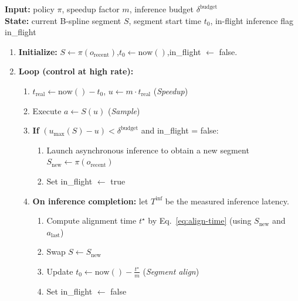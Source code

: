 \begin{algorithm}[h]
\caption{Inference pipeline}
\label{alg:pipeline-inference}
\textbf{Input:} policy $\pi$, speedup factor $m$, inference budget $\delta^{\text{budget}}$ \\
\textbf{State:} current B-spline segment $S$, segment start time $t_0$, in-flight inference flag \quad in\_flight
\begin{enumerate}[leftmargin=1.2em]
\item \textbf{Initialize:} $S \leftarrow \pi(o_{\text{recent}})$,\quad $t_0 \leftarrow \text{now}()$,\quad in\_flight $\leftarrow$ false.
\item \textbf{Loop (control at high rate):}
\begin{enumerate}[leftmargin=1.2em]
\item $t_{\text{real}} \leftarrow \text{now}() - t_0$, \quad $u \leftarrow m \cdot t_{\text{real}}$ \hfill(\textit{Speedup})
\item Execute $a \leftarrow S(u)$ \hfill(\textit{Sample})
\item \textbf{If} $(u_{\max}(S) - u) < \delta^{\text{budget}}$ and in\_flight = false:
\begin{enumerate}[leftmargin=1.2em]
\item Launch asynchronous inference to obtain a new segment $S_{\text{new}} \leftarrow \pi(o_{\text{recent}})$
\item Set in\_flight $\leftarrow$ true
\end{enumerate}
\item \textbf{On inference completion:} let $T^{\text{inf}}$ be the measured inference latency.
\begin{enumerate}[leftmargin=1.2em]
\item Compute alignment time $t^\star$ by Eq.~\eqref{eq:align-time} (using $S_{\text{new}}$ and $a_{\text{last}}$)
\item Swap $S \leftarrow S_{\text{new}}$
\item Update $t_0 \leftarrow \text{now}() - \frac{t^\star}{m}$ \hfill(\textit{Segment align})
\item Set in\_flight $\leftarrow$ false
\end{enumerate}
\end{enumerate}
\end{enumerate}
\end{algorithm}

